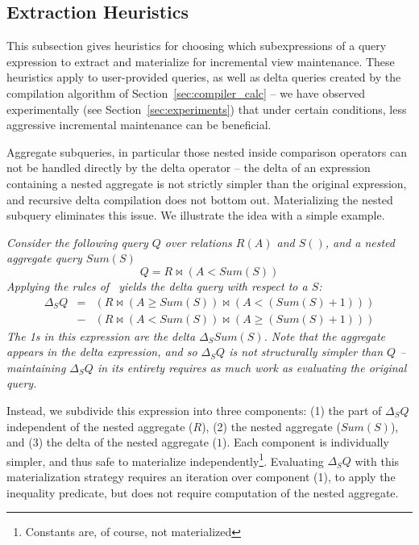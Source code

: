 \subsection{Extraction Heuristics}
\label{sec:advanced-rewriting}

This subsection gives heuristics for choosing which subexpressions of
a query expression to extract and materialize for incremental view maintenance.  These heuristics apply to user-provided queries, as well as delta queries created by the compilation algorithm of Section~\ref{sec:compiler_calc} -- we have observed experimentally (see Section~\ref{sec:experiments}) that under certain conditions, less aggressive incremental maintenance can be beneficial.

Aggregate subqueries, in particular those nested inside comparison operators can not be handled directly by the delta operator -- the delta of an expression containing a nested aggregate is not strictly simpler than the original expression, and recursive delta compilation does not bottom out.  Materializing the nested subquery eliminates this issue.  We illustrate the idea with a simple example.

\begin{example} \em
Consider the following query $Q$ over relations $R(A)$ and $S()$, and a nested aggregate query $Sum(S)$
{\small $$Q = R \bowtie (A < Sum(S))$$}
Applying the rules of~\cite{koch-pods:10} yields the delta query with respect to a $S$:
{\small \begin{eqnarray*}
\Delta_SQ & =  & (R \bowtie (A \geq Sum(S)) \bowtie (A < (Sum(S) +1)))\\
&-& (R \bowtie (A <  Sum(S)) \bowtie (A \geq (Sum(S) + 1)))
\end{eqnarray*}}
The 1s in this expression are the delta $\Delta_S Sum(S)$.  Note that the aggregate appears in the delta expression, and so $\Delta_SQ$ is not structurally simpler than $Q$ -- maintaining $\Delta_S Q$ in its entirety requires as much work as evaluating the original query.  

Instead, we subdivide this expression into three components: (1) the part of $\Delta_S Q$ independent of the nested aggregate ($R$), (2) the nested aggregate ($Sum(S)$), and (3) the delta of the nested aggregate ($1$).  Each component is individually simpler, and thus safe to materialize independently\footnote{Constants are, of course, not materialized}.  Evaluating $\Delta_S Q$ with this materialization strategy requires an iteration over component (1), to apply the inequality predicate, but does not require computation of the nested aggregate.
\end{example}

